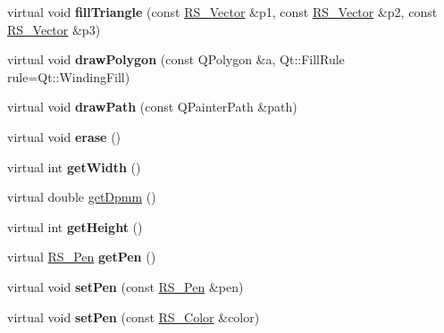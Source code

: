 \begin{DoxyCompactItemize}
\item 
\hypertarget{classRS__PainterQt_aa1dc76a31842beba63e692f479e1f616}{virtual void {\bfseries fill\-Triangle} (const \hyperlink{classRS__Vector}{R\-S\-\_\-\-Vector} \&p1, const \hyperlink{classRS__Vector}{R\-S\-\_\-\-Vector} \&p2, const \hyperlink{classRS__Vector}{R\-S\-\_\-\-Vector} \&p3)}\label{classRS__PainterQt_aa1dc76a31842beba63e692f479e1f616}

\item 
\hypertarget{classRS__PainterQt_a5fce00ef2b7d231211d71aefcd38e186}{virtual void {\bfseries draw\-Polygon} (const Q\-Polygon \&a, Qt\-::\-Fill\-Rule rule=Qt\-::\-Winding\-Fill)}\label{classRS__PainterQt_a5fce00ef2b7d231211d71aefcd38e186}

\item 
\hypertarget{classRS__PainterQt_acbd4f5a0c3068bfe0aa8c5d3f896b881}{virtual void {\bfseries draw\-Path} (const Q\-Painter\-Path \&path)}\label{classRS__PainterQt_acbd4f5a0c3068bfe0aa8c5d3f896b881}

\item 
\hypertarget{classRS__PainterQt_a03d9b3648dd56e5c1e29cc01953a0f75}{virtual void {\bfseries erase} ()}\label{classRS__PainterQt_a03d9b3648dd56e5c1e29cc01953a0f75}

\item 
\hypertarget{classRS__PainterQt_ade13888fa68a3c7d3f0fd6d02eb6ce4f}{virtual int {\bfseries get\-Width} ()}\label{classRS__PainterQt_ade13888fa68a3c7d3f0fd6d02eb6ce4f}

\item 
virtual double \hyperlink{classRS__PainterQt_a3aa0d9bfb86f6ef4c9567ff74fcfd9ec}{get\-Dpmm} ()
\item 
\hypertarget{classRS__PainterQt_a96384174384969bfb50e92d3872949dd}{virtual int {\bfseries get\-Height} ()}\label{classRS__PainterQt_a96384174384969bfb50e92d3872949dd}

\item 
\hypertarget{classRS__PainterQt_a9ee2c69bcb092c09646fee34126a31a3}{virtual \hyperlink{classRS__Pen}{R\-S\-\_\-\-Pen} {\bfseries get\-Pen} ()}\label{classRS__PainterQt_a9ee2c69bcb092c09646fee34126a31a3}

\item 
\hypertarget{classRS__PainterQt_aae7b2610518ca002ba79a2ff5eb55566}{virtual void {\bfseries set\-Pen} (const \hyperlink{classRS__Pen}{R\-S\-\_\-\-Pen} \&pen)}\label{classRS__PainterQt_aae7b2610518ca002ba79a2ff5eb55566}

\item 
\hypertarget{classRS__PainterQt_a7985a3ddc58ed8bd4f0faa3b039c0e52}{virtual void {\bfseries set\-Pen} (const \hyperlink{classRS__Color}{R\-S\-\_\-\-Color} \&color)}\label{classRS__PainterQt_a7985a3ddc58ed8bd4f0faa3b039c0e52}


\end{DoxyCompactItemize}
